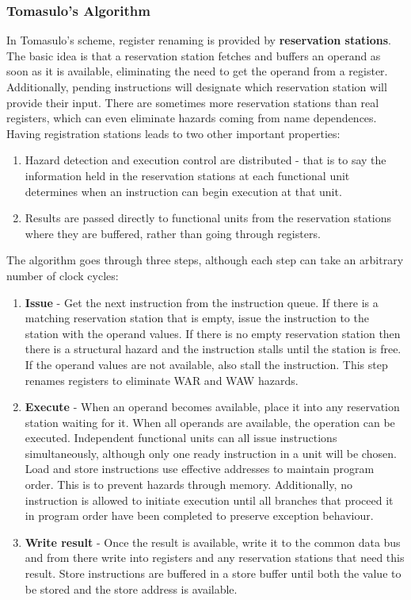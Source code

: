 \documentclass[11pt]{article}
\begin{document}
\subsubsection{Tomasulo's Algorithm}
In Tomasulo's scheme, register renaming is provided by \textbf{reservation stations}. The basic idea is that a reservation station fetches and buffers an operand as soon as it is available, eliminating the need to get the operand from a register. Additionally, pending instructions will designate which reservation station will provide their input. There are sometimes more reservation stations than real registers, which can even eliminate hazards coming from name dependences. 
\n
Having registration stations leads to two other important properties:
\begin{enumerate}
\item Hazard detection and execution control are distributed - that is to say the information held in the reservation stations at each functional unit determines when an instruction can begin execution at that unit.
\item Results are passed directly to functional units from the reservation stations where they are buffered, rather than going through registers.
\end{enumerate}
\noindent
The algorithm goes through three steps, although each step can take an arbitrary number of clock cycles:
\begin{enumerate}
\item \textbf{Issue} - Get the next instruction from the instruction queue. If there is a matching reservation station that is empty, issue the instruction to the station with the operand values. If there is no empty reservation station then there is a structural hazard and the instruction stalls until the station is free. If the operand values are not available, also stall the instruction. This step renames registers to eliminate WAR and WAW hazards.
\item \textbf{Execute} - When an operand becomes available, place it into any reservation station waiting for it. When all operands are available, the operation can be executed. Independent functional units can all issue instructions simultaneously, although only one ready instruction in a unit will be chosen. 
\n
Load and store instructions use effective addresses to maintain program order. This is to prevent hazards through memory. Additionally, no instruction is allowed to initiate execution until all branches that proceed it in program order have been completed to preserve exception behaviour. 
\item \textbf{Write result} - Once the result is available, write it to the common data bus and from there write into registers and any reservation stations that need this result. Store instructions are buffered in a store buffer until both the value to be stored and the store address is available.
\end{enumerate}
\end{document}
